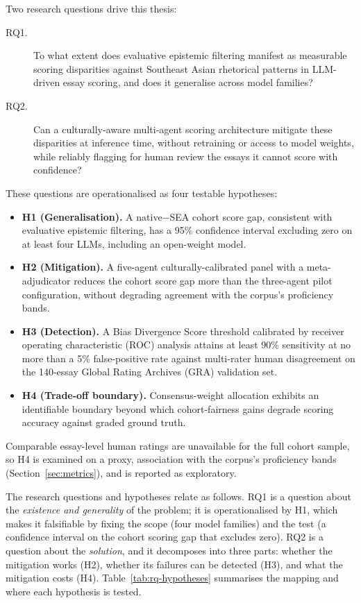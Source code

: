 Two research questions drive this thesis:

\begin{description}
  \item[RQ1.] To what extent does evaluative epistemic filtering
        manifest as measurable scoring disparities against Southeast
        Asian rhetorical patterns in LLM-driven essay scoring, and does
        it generalise across model families?
  \item[RQ2.] Can a culturally-aware multi-agent scoring architecture
        mitigate these disparities at inference time, without
        retraining or access to model weights, while reliably
        flagging for human review the essays it cannot score
        with confidence?
\end{description}

These questions are operationalised as four testable hypotheses:

\begin{itemize}
  \item \textbf{H1 (Generalisation).} A native$-$SEA cohort score
        gap, consistent with evaluative epistemic filtering, has a
        95\% confidence interval excluding zero on at least four
        LLMs, including an open-weight model.
  \item \textbf{H2 (Mitigation).} A five-agent culturally-calibrated
        panel with a meta-adjudicator reduces the cohort score gap
        more than the three-agent pilot configuration, without
        degrading agreement with the corpus's proficiency bands.
  \item \textbf{H3 (Detection).} A Bias Divergence Score threshold
        calibrated by receiver operating characteristic (ROC) analysis
        attains at least 90\% sensitivity at no more
        than a 5\% false-positive rate against multi-rater human
        disagreement on the 140-essay Global Rating Archives (GRA)
        validation set.
  \item \textbf{H4 (Trade-off boundary).} Consensus-weight allocation
        exhibits an identifiable boundary beyond which cohort-fairness
        gains degrade scoring accuracy against graded ground truth.
\end{itemize}

Comparable essay-level human ratings are unavailable for the full
cohort sample, so H4 is examined on a proxy, association with the
corpus's proficiency bands (Section~\ref{sec:metrics}), and is
reported as exploratory.

The research questions and hypotheses relate as follows. RQ1 is a
question about the \emph{existence and generality} of the problem; it
is operationalised by H1, which makes it falsifiable by fixing the
scope (four model families) and the test (a confidence interval on
the cohort scoring gap that excludes zero). RQ2 is a question about the \emph{solution},
and it decomposes into three parts: whether the mitigation works (H2),
whether its failures can be detected (H3), and what the mitigation
costs (H4). Table~\ref{tab:rq-hypotheses} summarises the mapping and
where each hypothesis is tested.

